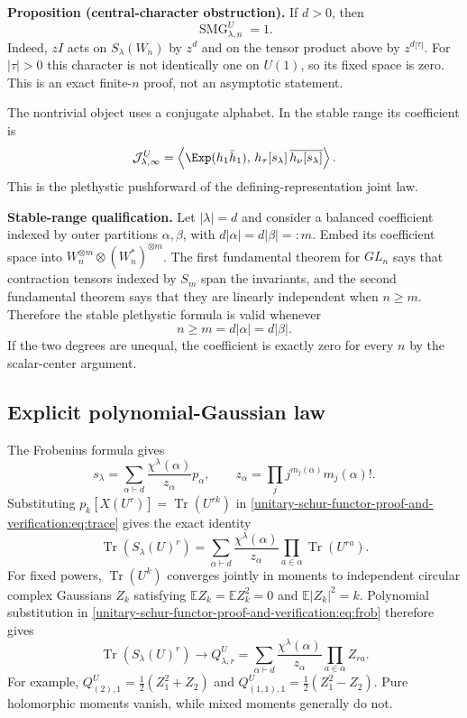 \documentclass[10pt]{article}
\newcommand{\Tr}{\operatorname{Tr}}
\newcommand{\SMG}{\operatorname{SMG}}
\newcommand{\MGF}{\SMG}
\begin{document}
\textbf{Proposition (central-character obstruction).} If $d>0$, then
\begin{equation}\label{unitary-schur-functor-proof-and-verification:eq:hol}
 \boxed{\MGF^U_{\lambda,n}=1.}
\end{equation}
Indeed, $zI$ acts on $S_\lambda(W_n)$ by $z^d$ and on the tensor product above by $z^{d|\tau|}$. For $|\tau|>0$ this character is not identically one on $U(1)$, so its fixed space is zero. This is an exact finite-$n$ proof, not an asymptotic statement.

The nontrivial object uses a conjugate alphabet. In the stable range its coefficient is
\begin{equation}
 [m_\tau\bar m_\nu]\mathcal J^U_{\lambda,\infty}
 =\left\langle \Exp(h_1\bar h_1),\,h_\tau[s_\lambda]\,\overline{h_\nu[s_\lambda]}\right\rangle.
\end{equation}
This is the plethystic pushforward of the defining-representation joint law.

\textbf{Stable-range qualification.}  Let $|\lambda|=d$ and consider a
balanced coefficient indexed by outer partitions $\alpha,\beta$, with
$d|\alpha|=d|\beta|=:m$.  Embed its coefficient space into
$W_n^{\otimes m}\otimes(W_n^*)^{\otimes m}$.  The first fundamental theorem
for $GL_n$ says that contraction tensors indexed by $S_m$ span the invariants,
and the second fundamental theorem says that they are linearly independent
when $n\geq m$.  Therefore the stable plethystic formula is valid whenever
\[
n\geq m=d|\alpha|=d|\beta|.
\]
If the two degrees are unequal, the coefficient is exactly zero for every $n$
by the scalar-center argument.

\subsection{Explicit polynomial-Gaussian law}
The Frobenius formula gives
\begin{equation}
 s_\lambda=\sum_{\alpha\vdash d}\frac{\chi^\lambda(\alpha)}{z_\alpha}p_\alpha,
 \qquad z_\alpha=\prod_j j^{m_j(\alpha)}m_j(\alpha)!.
\end{equation}
Substituting $p_k[X(U^r)]=\Tr(U^{rk})$ in \eqref{unitary-schur-functor-proof-and-verification:eq:trace} gives the exact identity
\begin{equation}\label{unitary-schur-functor-proof-and-verification:eq:frob}
 \Tr(S_\lambda(U)^r)=\sum_{\alpha\vdash d}\frac{\chi^\lambda(\alpha)}{z_\alpha}
 \prod_{a\in\alpha}\Tr(U^{ra}).
\end{equation}
For fixed powers, $\Tr(U^k)$ converges jointly in moments to independent circular complex Gaussians $Z_k$ satisfying $\mathbb E Z_k=\mathbb E Z_k^2=0$ and $\mathbb E|Z_k|^2=k$. Polynomial substitution in \eqref{unitary-schur-functor-proof-and-verification:eq:frob} therefore gives
\begin{equation}
 \Tr(S_\lambda(U)^r)\longrightarrow
 Q^U_{\lambda,r}=\sum_{\alpha\vdash d}\frac{\chi^\lambda(\alpha)}{z_\alpha}\prod_{a\in\alpha}Z_{ra}.
\end{equation}
For example, $Q^U_{(2),1}=\tfrac12(Z_1^2+Z_2)$ and $Q^U_{(1,1),1}=\tfrac12(Z_1^2-Z_2)$. Pure holomorphic moments vanish, while mixed moments generally do not.
\end{document}
